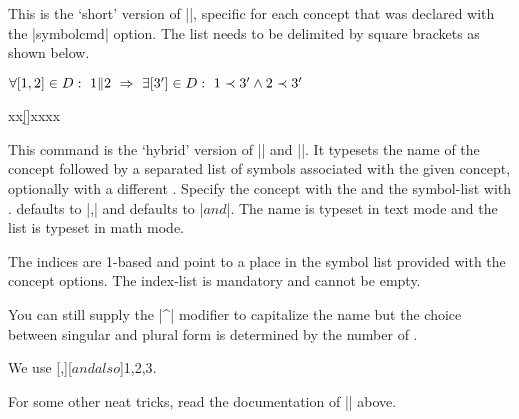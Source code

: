 \documentclass[a4paper]{packagedoc}
\begin{document}

This is the `short' version of |\ConceptSymbols|, specific for each concept that
was declared with the |symbolcmd| option. The  list needs
to be delimited by square brackets as shown below.

\begin{latex-example-show}
$\forall \d[1,2] \in D:\ \d1 \| \d2\ \Rightarrow\ {}
  \exists \d[3'] \in D:\ \d1 \prec \d3' \land \d2 \prec \d3'$
\end{latex-example-show}
%
\begin{latex-example-show}
xx\d[]xx\p[]xx
\end{latex-example-show}



This command is the `hybrid' version of |\ConceptName| and |\ConceptSymbols|.
It typesets the name of the concept followed by a  separated list
of symbols associated with the given concept, optionally with a different
. Specify the concept with the  and the
symbol-list with .  defaults to |,| and
 defaults to |$ and $|. The name is typeset in text mode and
the list is typeset in math mode.

The indices are 1-based and point to a place in the symbol list provided with the
concept options. The index-list is mandatory and cannot be empty.

You can still supply the |^| modifier to capitalize the name but the choice
between singular and plural form is determined by the number of .

\begin{latex-example-show}
We use [,][$ and also $]{1,2,3}.
\end{latex-example-show}

For some other neat tricks, read the documentation of |\ConceptSymbols| above.


\end{document}
